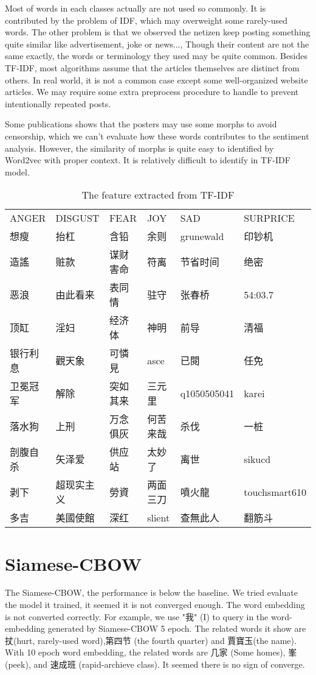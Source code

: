 Most of words in each classes actually are not used so commonly. It is contributed by the problem of IDF, which may overweight some rarely-used words.
The other problem is that we observed the netizen keep posting something quite similar like advertisement, joke or news..., 
Though their content are not the same exactly, the words or terminology they used may be quite common. 
Besides TF-IDF, most algorithms assume that the articles themselves are distinct from others. In real world, it is not a common case except some well-organized website articles.
We may require some extra preprocess procedure to handle to prevent intentionally repeated posts.

Some publications\cite{Chen2013TUP251293825} shows that the posters may use some morphs to avoid censorship, which we can't evaluate how these words contributes to the sentiment analysis. 
However, the similarity of morphs is quite easy to identified by Word2vec with proper context. 
It is relatively difficult to identify in TF-IDF model. 

\begin{table}[]
\centering
\caption{The feature extracted from TF-IDF}
\label{featureoftfidf}
\begin{tabular}{llllll}
ANGER	& DISGUST	& FEAR	& JOY	& SAD	& SURPRICE \\
想瘦	&抬杠	&含铅	&余则	&grunewald	&印钞机 \\
造謠	&赃款	&谋财害命	&符离	&节省时间	&绝密\\
恶浪	&由此看来	&表同情	&驻守	&张春桥	&54:03.7\\
顶缸	&淫妇	&经济体	&神明	&前导	&清福\\
银行利息	&觀天象	&可憐見	&asce	&已閱	&任免\\
卫冕冠军	&解除	&突如其来	&三元里	&q1050505041	&karei\\
落水狗	&上刑	&万念俱灰	&何苦来哉	&杀伐	&一桩\\
剖腹自杀	&矢泽爱	&供应站	&太妙了	&离世	&sikucd\\
剥下	&超现实主义	&勞資	&两面三刀	&噴火龍	&touchsmart610\\
多吉	&美國使館	&深红	&slient	&查無此人	&翻筋斗
\end{tabular}
\end{table}

\section{Siamese-CBOW}

The Siamese-CBOW, the performance is below the baseline. We tried evaluate the model it trained, it seemed it is not converged enough. 
The word embedding is not converted correctly. For example, we use "我" (I) to query in the word-embedding generated by Siamese-CBOW 5 epoch. 
The related words it show are 扙(hurt, rarely-used word),第四节 (the fourth quarter) and 賈寶玉(the name). With 10 epoch word embedding, the  
related words are 几家 (Some homes), 峯(peek), and 速成班 (rapid-archieve class). It seemed there is no sign of converge.

